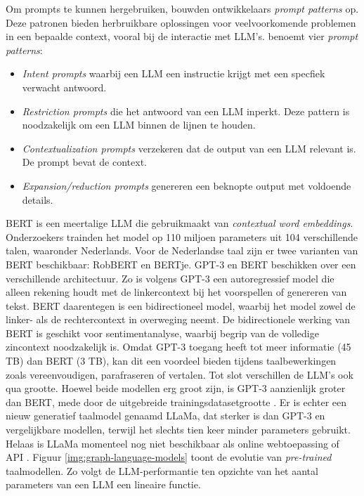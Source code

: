 Om prompts te kunnen hergebruiken, bouwden ontwikkelaars \textit{prompt patterns} op. Deze patronen bieden herbruikbare oplossingen voor veelvoorkomende problemen in een bepaalde context, vooral bij de interactie met LLM's. \textcite{White2023} benoemt vier \textit{prompt patterns}:

\begin{itemize}
	\item	\textit{Intent prompts} waarbij een LLM een instructie krijgt met een specfiek verwacht antwoord.
	\item	\textit{Restriction prompts} die het antwoord van een LLM inperkt. Deze pattern is noodzakelijk om een LLM binnen de lijnen te houden.
	\item 	\textit{Contextualization prompts} verzekeren dat de output van een LLM relevant is. De prompt bevat de context.
	\item	\textit{Expansion/reduction prompts} genereren een beknopte output met voldoende details. 
\end{itemize}

BERT is een meertalige LLM die gebruikmaakt van \textit{contextual word embeddings}. Onderzoekers trainden het model op 110 miljoen parameters uit 104 verschillende talen, waaronder Nederlands. Voor de Nederlandse taal zijn er twee varianten van BERT beschikbaar: RobBERT en BERTje. GPT-3 en BERT beschikken over een verschillende architectuur. Zo is volgens \textcite{Mottesi2023} GPT-3 een autoregressief model die alleen rekening houdt met de linkercontext bij het voorspellen of genereren van tekst. BERT daarentegen is een bidirectioneel model, waarbij het model zowel de linker- als de rechtercontext in overweging neemt. De bidirectionele werking van BERT is geschikt voor sentimentanalyse, waarbij begrip van de volledige zincontext noodzakelijk is. Omdat GPT-3 toegang heeft tot meer informatie (45 TB) dan BERT (3 TB), kan dit een voordeel bieden tijdens taalbewerkingen zoals vereenvoudigen, parafraseren of vertalen. Tot slot verschillen de LLM's ook qua grootte. Hoewel beide modellen erg groot zijn, is GPT-3 aanzienlijk groter dan BERT, mede door de uitgebreide trainingsdatasetgrootte \autocite{Brown2020}. Er is echter een nieuw generatief taalmodel genaamd LLaMa, dat sterker is dan GPT-3 en vergelijkbare modellen, terwijl het slechts tien keer minder parameters gebruikt. Helaas is LLaMa momenteel nog niet beschikbaar als online webtoepassing of API \autocite{Hern2023, Touvron2023}. Figuur \ref{img:graph-language-models} toont de evolutie van \textit{pre-trained} taalmodellen. Zo volgt de LLM-performantie ten opzichte van het aantal parameters van een LLM een lineaire functie.

